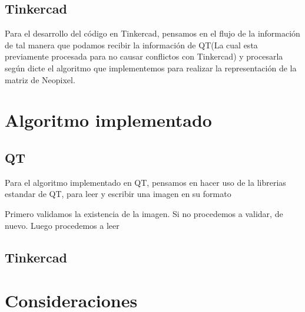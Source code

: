 \documentclass{article}
\begin{document}
    
    \subsection{Tinkercad}
    \begin{flushleft}
        Para el desarrollo del código en Tinkercad, pensamos en el flujo de la información de tal manera que podamos recibir la información de QT(La cual esta previamente procesada para no causar conflictos con Tinkercad) y procesarla según dicte el algoritmo que implementemos para realizar la representación de la matriz de Neopixel. 
    \end{flushleft}
        
    
\section{Algoritmo implementado}
\label{implementado}
    \begin{flushleft}
        
    \subsection{QT}
    Para el algoritmo implementado en QT,  pensamos en hacer uso de la librerias estandar de QT, para leer y escribir una imagen en su formato 
    
    
    
    Primero validamos la existencia de la imagen. Si no procedemos a validar, de nuevo. Luego procedemos a leer 
    \end{flushleft}

    \vspace*{0.5cm}
    
    \subsection{Tinkercad}
    \begin{flushleft}
        
    \end{flushleft}
    
    \vspace*{0.1cm}
    
\section{Consideraciones}
\label{consideraciones}
    \begin{flushleft}
        
    \end{flushleft}
    \vspace*{2cm}
\newpage    
    

\vfill
\vspace*{0.5cm}

\end{document}

